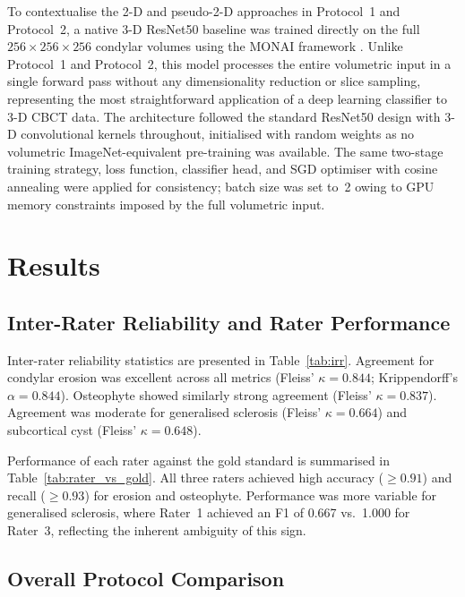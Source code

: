 \documentclass[review,12pt]{elsarticle}
\begin{document}
To contextualise the 2-D and pseudo-2-D approaches in Protocol~1 and
Protocol~2, a native 3-D ResNet50 baseline was trained directly on the
full $256 \times 256 \times 256$ condylar volumes using the MONAI
framework \cite{monai2026}. Unlike Protocol~1 and Protocol~2, this model
processes the entire volumetric input in a single forward pass without
any dimensionality reduction or slice sampling, representing the most
straightforward application of a deep learning classifier to 3-D CBCT
data. The architecture followed the standard ResNet50 design with 3-D
convolutional kernels throughout, initialised with random weights as
no volumetric ImageNet-equivalent pre-training was available. The same
two-stage training strategy, loss function, classifier head, and
SGD optimiser with cosine annealing were applied for consistency;
batch size was set to~2 owing to GPU memory constraints imposed by the
full volumetric input.

\section{Results}
\label{sec:results}

\subsection{Inter-Rater Reliability and Rater Performance}
\label{sec:irr_results}

Inter-rater reliability statistics are presented in
Table~\ref{tab:irr}. Agreement for condylar erosion was excellent
across all metrics (Fleiss' $\kappa = 0.844$; Krippendorff's
$\alpha = 0.844$). Osteophyte showed similarly strong agreement
(Fleiss' $\kappa = 0.837$). Agreement was moderate for generalised
sclerosis (Fleiss' $\kappa = 0.664$) and subcortical cyst (Fleiss'
$\kappa = 0.648$).

Performance of each rater against the gold standard is summarised in
Table~\ref{tab:rater_vs_gold}. All three raters achieved high accuracy
($\geq 0.91$) and recall ($\geq 0.93$) for erosion and osteophyte.
Performance was more variable for generalised sclerosis, where Rater~1
achieved an F1 of 0.667 vs.\ 1.000 for Rater~3, reflecting the
inherent ambiguity of this sign.

\subsection{Overall Protocol Comparison}
\label{sec:proto_compare}
\end{document}
